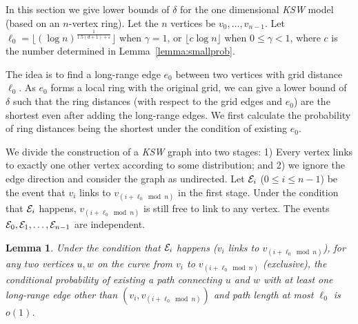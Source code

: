 \documentclass[11pt]{article}
\newtheorem{lem}{Lemma}
\def\KSW{{\it KSW }}
\begin{document}
In this section we give lower bounds of $\delta$ for the one dimensional
	\KSW model (based on an $n$-vertex ring). 
Let the $n$ vertices be $v_0,\ldots,v_{n-1}$. Let $\ell_0=\lfloor(\log n)^{\frac{1}{1.5(d+1)+\varepsilon}}\rfloor$ when $\gamma=1$, or $\lfloor c\log n\rfloor$ when $0\leq\gamma<1$, where $c$ is the number determined in Lemma~\ref{lemma:smallprob}.

The idea is to find a long-range edge $e_0$ between two vertices with grid distance $\ell_0$. 
As $e_0$ forms a local ring with the original grid, we can give a lower bound 
	of $\delta$ such that the ring distances (with respect to the 
	grid edges and $e_0$) are the shortest even after adding the long-range
	edges. 
We first calculate the probability of ring distances being the shortest under the condition of existing $e_0$.

We divide the construction of a \KSW graph into two stages: 1) Every vertex 
	links to exactly one other vertex according to some distribution; and
	2) we ignore the edge direction and consider the graph as undirected. 
Let ${\cal E}_i$ ($0\leq i\leq n-1$) be the event that $v_i$ links to 
	$v_{(i+\ell_0\bmod n)}$ in the first stage. 
Under the condition that ${\cal E}_i$ happens, $v_{(i+\ell_0\bmod n)}$ is still free to link to any vertex. 
The events ${\cal E}_0,{\cal E}_1,\ldots,{\cal E}_{n-1}$ are independent.

\begin{lem} \label{lemma:1dsmallprob}
Under the condition that ${\cal E}_i$ happens ($v_i$ links to $v_{(i+\ell_0\bmod n)}$), for any two vertices $u,w$ on the curve from $v_i$ to $v_{(i+\ell_0\bmod n)}$ (exclusive), the conditional probability of existing a path connecting $u$ and $w$ with at least one long-range edge other than $(v_i,v_{(i+\ell_0\bmod n)})$ and path length at most $\ell_0$ is $o(1)$.
\end{lem}
\end{document}

